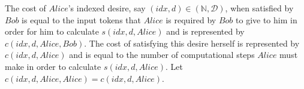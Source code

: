 \begin{definition}
  The cost of $Alice$'s indexed desire, say $\left(idx, d\right) \in \left(\mathbb{N}, \mathcal{D}\right)$, when satisfied by
  $Bob$ is equal to the input tokens that $Alice$ is required by $Bob$ to give to him in order for him to calculate
  $s\left(idx, d, Alice\right)$ and is represented by $c\left(idx, d, Alice, Bob\right)$. The cost of satisfying this desire
  herself is represented by $c\left(idx, d, Alice\right)$ and is equal to the number of computational steps $Alice$ must make
  in order to calculate $s\left(idx, d, Alice\right)$. Let $c\left(idx, d, Alice, Alice\right) = c\left(idx, d, Alice\right)$.
\end{definition}
